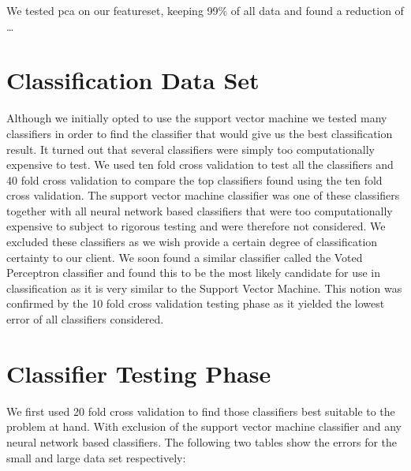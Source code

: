 \documentclass[%
        compressed,
        final,
        notitlepage,
        narroweqnarray,
        inline,
        twoside,
        ]{ieee}
\begin{document}
We tested pca on our featureset, keeping 99\% of all data and found a reduction of …%

\section{Classification Data Set}
Although we initially opted to use the support vector machine we tested many classifiers in order to find the classifier that would give us the best classification result. It turned out that several classifiers were simply too computationally expensive to test. We used ten fold cross validation to test all the classifiers and 40 fold cross validation to compare the top classifiers found using the ten fold cross validation. The support vector machine classifier was one of these classifiers together with all neural network based classifiers that were too computationally expensive to subject to rigorous testing and were therefore not considered. We excluded these classifiers as we wish provide a certain degree of classification certainty to our client. We soon found a similar classifier called the Voted Perceptron classifier and found this to be the most likely candidate for use in classification as it is very similar to the Support Vector Machine. This notion was confirmed by the 10 fold cross validation testing phase as it yielded the lowest error of all classifiers considered.

\section{Classifier Testing Phase}
We first used 20 fold cross validation to find those classifiers best suitable to the problem at hand. With exclusion of the support vector machine classifier and any neural network based classifiers. The following two tables show the errors for the small and large data set respectively:
\end{document}
